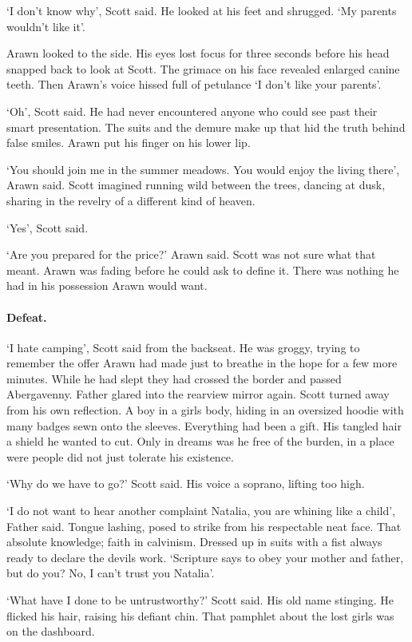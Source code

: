 `I don't know why', Scott said. He looked at his feet and
shrugged. `My parents wouldn't like it'.

Arawn looked to the side. His eyes lost focus for three seconds before
his head snapped back to look at Scott. The grimace on his face
revealed enlarged canine teeth. Then Arawn's voice hissed full of
petulance `I don't like your parents'.

`Oh', Scott said. He had never encountered anyone who could see past
their smart presentation. The suits and the demure make up that hid
the truth behind false smiles. Arawn put his finger on his lower lip.

`You should join me in the summer meadows. You would enjoy the living
there', Arawn said. Scott imagined running wild between the trees,
dancing at dusk, sharing in the revelry of a different kind of heaven.

`Yes', Scott said.

`Are you prepared for the price?' Arawn said. Scott was not sure what
that meant. Arawn was fading before he could ask to define it. There
was nothing he had in his possession Arawn would want.

\paragraph{Defeat.}

`I hate camping', Scott said from the backseat. He was groggy,
trying to remember the offer Arawn had made just to breathe in the
hope for a few more minutes. While he had slept they had crossed the
border and passed Abergavenny. Father glared into the rearview mirror
again. Scott turned away from his own reflection. A boy in a girls
body, hiding in an oversized hoodie with many badges sewn onto the
sleeves. Everything had been a gift. His tangled hair a shield he
wanted to cut. Only in dreams was he free of the burden, in a place
were people did not just tolerate his existence.

`Why do we have to go?' Scott said. His voice a soprano, lifting too high.

`I do not want to hear another complaint Natalia, you are whining
like a child', Father said. Tongue lashing, posed to strike from his
respectable neat face. That absolute knowledge; faith in
calvinism. Dressed up in suits with a fist always ready to declare the
devils work. `Scripture says to obey your mother and father, but do
you? No, I can't trust you Natalia'.

`What have I done to be untrustworthy?' Scott said. His old name
stinging. He flicked his hair, raising his defiant chin. That pamphlet
about the lost girls was on the dashboard.

